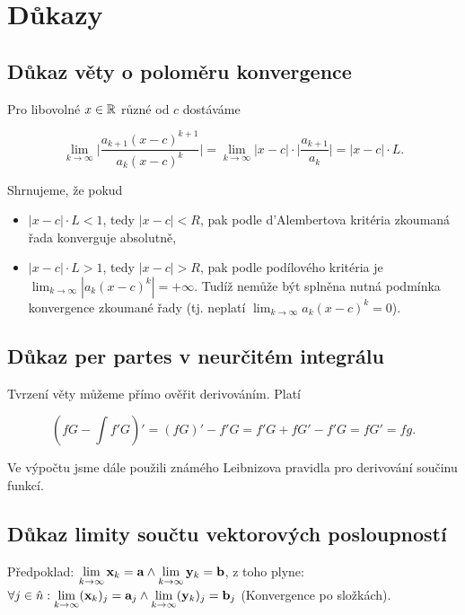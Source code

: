 \section{Důkazy}

\subsection*{Důkaz věty o poloměru konvergence}

Pro libovolné $x\in\mathbb{R}$ různé od $c$ dostáváme

\[ \lim_{k\to\infty} \bigg| \frac{a_{k+1} (x-c)^{k+1}}{a_k (x-c)^k} \bigg| = \lim_{k\to\infty} |x - c| \cdot \bigg| \frac{a_{k+1}}{a_k} \bigg| = |x - c| \cdot L. \]

\noindent Shrnujeme, že pokud
\begin{itemize}
    \item $|x - c| \cdot L < 1$, tedy $|x - c| < R$, pak podle d'Alembertova kritéria zkoumaná řada konverguje absolutně,
    \item $|x - c| \cdot L > 1$, tedy $|x - c| > R$, pak podle podílového kritéria je $\displaystyle\lim_{k\to\infty} |a_k (x-c)^k| = +\infty$. Tudíž nemůže být splněna nutná podmínka konvergence zkoumané řady (tj. neplatí $\displaystyle\lim_{k\to\infty} a_k (x-c)^k = 0$).
\end{itemize}

\subsection*{Důkaz per partes v neurčitém integrálu}

Tvrzení věty můžeme přímo ověřit derivováním. Platí

\[ \left( fG - \int f' G \right)' = (fG)' - f'G = f'G + fG' - f'G = fG' = fg. \]

\noindent Ve výpočtu jsme dále použili známého Leibnizova pravidla pro derivování součinu
funkcí.

\subsection*{Důkaz limity součtu vektorových posloupností}

Předpoklad: $\lim\limits_{k\to\infty} \mathbf{x}_k = \mathbf{a} \wedge
    \lim\limits_{k\to\infty} \mathbf{y}_k = \mathbf{b}$, z toho plyne: $\forall j \in \hat{n}:
    \lim\limits_{k\to\infty} (\mathbf{x}_k)_j = \mathbf{a}_j \wedge \lim\limits_{k\to\infty}
    (\mathbf{y}_k)_j = \mathbf{b}_j$ (Konvergence po složkách).

\vspace{1em}


